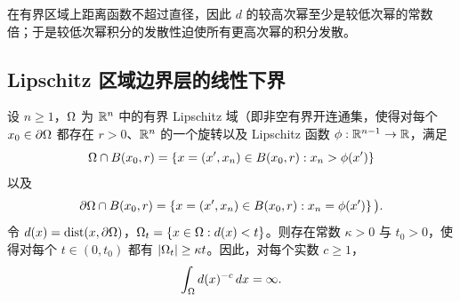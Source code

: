 \begin{remark}[直觉]
在有界区域上距离函数不超过直径，因此 $d$ 的较高次幂至少是较低次幂的常数倍；于是较低次幂积分的发散性迫使所有更高次幂的积分发散。
\end{remark}

\subsection{Lipschitz 区域边界层的线性下界}

\begin{theorem}
设 $n\ge 1$，$\Omega$ 为 $\mathbb{R}^n$ 中的有界 Lipschitz 域（即非空有界开连通集，使得对每个 $x_0\in\partial\Omega$ 都存在 $r>0$、$\mathbb{R}^n$ 的一个旋转以及 Lipschitz 函数 $\phi:\mathbb{R}^{n-1}\to\mathbb{R}$，满足
\[
  \Omega\cap B(x_0,r)=\{x=(x',x_n)\in B(x_0,r) : x_n>\phi(x')\}
\]
以及
\[
  \partial\Omega\cap B(x_0,r)=\{x=(x',x_n)\in B(x_0,r) : x_n=\phi(x')\}\,\big).
\]
令 $d(x)=\operatorname{dist}(x,\partial\Omega)$，$\Omega_{t}=\{x\in\Omega : d(x)<t\}$。则存在常数 $\kappa>0$ 与 $t_0>0$，使得对每个 $t\in(0,t_0)$ 都有 $|\Omega_{t}|\ge\kappa t$。因此，对每个实数 $c\ge1$，
\[
  \int_\Omega d(x)^{-c}\,dx=\infty .
\]
\end{theorem}

